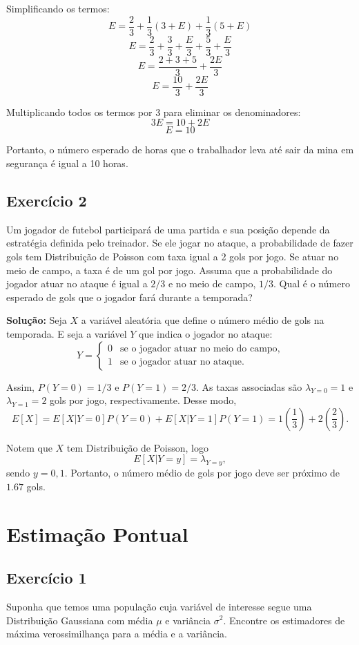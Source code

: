 \documentclass{article}
\begin{document}
Simplificando os termos:
    $$
    E = \frac{2}{3} + \frac{1}{3}(3 + E) + \frac{1}{3}(5 + E)
    $$
    $$
    E = \frac{2}{3} + \frac{3}{3} + \frac{E}{3} + \frac{5}{3} + \frac{E}{3}
    $$
    $$
    E = \frac{2 + 3 + 5}{3} + \frac{2E}{3}
    $$
    $$
    E = \frac{10}{3} + \frac{2E}{3}
    $$

Multiplicando todos os termos por 3 para eliminar os denominadores:
    $$
    3E = 10 + 2E
    $$
    $$
    E = 10
    $$

Portanto, o número esperado de horas que o trabalhador leva até sair da mina em segurança é igual a 10 horas.

\subsection{Exercício 2}
Um jogador de futebol participará de uma partida e sua posição depende da estratégia definida pelo treinador. Se ele jogar no ataque, a probabilidade de fazer gols tem Distribuição de Poisson com taxa igual a 2 gols por jogo. Se atuar no meio de campo, a taxa é de um gol por jogo. Assuma que a probabilidade do jogador atuar no ataque é igual a $2/3$ e no meio de campo, $1/3$. Qual é o número esperado de gols que o jogador fará durante a temporada?

\vspace{0.5cm}
\textbf{Solução:} 
Seja $X$ a variável aleatória que define o número médio de gols na temporada. E seja a variável $Y$ que indica o jogador no ataque:
    $$
    Y = 
    \begin{cases}
    0 & \text{se o jogador atuar no meio do campo},\\
    1 & \text{se o jogador atuar no ataque}.
    \end{cases}
    $$

Assim, $P(Y = 0) = 1/3$ e $P(Y = 1) = 2/3$. As taxas associadas são $\lambda_{Y=0} = 1$ e $\lambda_{Y=1} = 2$ gols por jogo, respectivamente. Desse modo,
    $$
    E[X] = E[X|Y = 0]P(Y = 0) + E[X|Y = 1]P(Y = 1) = 1\left(\frac{1}{3}\right) + 2\left(\frac{2}{3}\right).
    $$

Notem que $X$ tem Distribuição de Poisson, logo 
    $$
    E[X|Y = y] = \lambda_{Y=y}, 
    $$ 
sendo $y = 0, 1$. Portanto, o número médio de gols por jogo deve ser próximo de $1.67$ gols.

\section{Estimação Pontual}
\subsection{Exercício 1}
Suponha que temos uma população cuja variável de interesse segue uma Distribuição Gaussiana com média $\mu$ e variância $\sigma^2$. Encontre os estimadores de máxima verossimilhança para a média e a variância.
\end{document}
